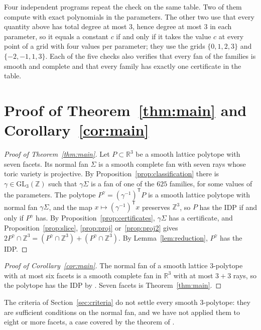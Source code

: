 \documentclass[12pt]{article}
\newcommand{\R}{\mathbb{R}}
\newcommand{\Z}{\mathbb{Z}}
\newcommand{\GL}{\mathrm{GL}}
\begin{document}
Four independent programs repeat the check on the same table. Two of them compute with exact polynomials in the parameters. The other two use that every quantity above has total degree at most $3$, hence degree at most $3$ in each parameter, so it equals a constant $c$ if and only if it takes the value $c$ at every point of a grid with four values per parameter; they use the grids $\{0,1,2,3\}$ and $\{-2,-1,1,3\}$. Each of the five checks also verifies that every fan of the families is smooth and complete and that every family has exactly one certificate in the table.

\section{Proof of Theorem~\ref{thm:main} and Corollary~\ref{cor:main}}

\begin{proof}[Proof of Theorem~\ref{thm:main}]
Let $P\subset\R^3$ be a smooth lattice polytope with seven facets. Its normal fan $\Sigma$ is a smooth complete fan with seven rays whose toric variety is projective. By Proposition~\ref{prop:classification} there is $\gamma\in\GL_3(\Z)$ such that $\gamma\Sigma$ is a fan of one of the $625$ families, for some values of the parameters. The polytope $P^\gamma=(\gamma^{-1})^{\mathsf T}P$ is a smooth lattice polytope with normal fan $\gamma\Sigma$, and the map $x\mapsto(\gamma^{-1})^{\mathsf T}x$ preserves $\Z^3$, so $P$ has the IDP if and only if $P^\gamma$ has. By Proposition~\ref{prop:certificates}, $\gamma\Sigma$ has a certificate, and Proposition~\ref{prop:slice}, \ref{prop:proj} or~\ref{prop:proj2} gives $2P^\gamma\cap\Z^3=(P^\gamma\cap\Z^3)+(P^\gamma\cap\Z^3)$. By Lemma~\ref{lem:reduction}, $P^\gamma$ has the IDP.
\end{proof}

\begin{proof}[Proof of Corollary~\ref{cor:main}]
The normal fan of a smooth lattice $3$-polytope with at most six facets is a smooth complete fan in $\R^3$ with at most $3+3$ rays, so the polytope has the IDP by \cite[Theorem~1.4]{Rob24}. Seven facets is Theorem~\ref{thm:main}.
\end{proof}

The criteria of Section~\ref{sec:criteria} do not settle every smooth $3$-polytope: they are sufficient conditions on the normal fan, and we have not applied them to eight or more facets, a case covered by the theorem of \cite{Mic26,CuLi26}.

\appendix
\end{document}
